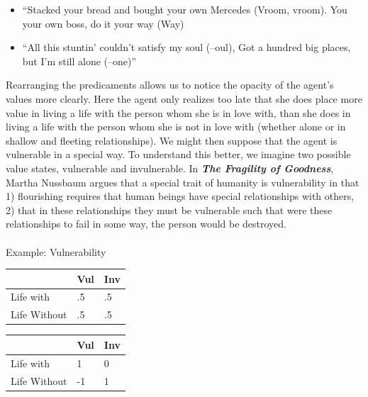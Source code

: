 \documentclass[
  letterpaper,
  DIV=11,
  numbers=noendperiod]{scrartcl}
\makeatletter
\let\oldparagraph\paragraph
\renewcommand{\paragraph}{
    \@ifstar
      \xxxParagraphStar
      \xxxParagraphNoStar
  }
\newcommand{\xxxParagraphStar}[1]{\oldparagraph*{#1}\mbox{}}
\newcommand{\xxxParagraphNoStar}[1]{\oldparagraph{#1}\mbox{}}
\newcounter{none} %
\providecommand{\tightlist}{%
  \setlength{\itemsep}{0pt}\setlength{\parskip}{0pt}}
\makeatother
\begin{document}
\begin{itemize}
\tightlist
\item
  ``Stacked your bread and bought your own Mercedes (Vroom, vroom). You
  your own boss, do it your way (Way)
\item
  ``All this stuntin' couldn't satisfy my soul (--oul), Got a hundred
  big places, but I'm still alone (--one)''
\end{itemize}

Rearranging the predicaments allows us to notice the opacity of the
agent's values more clearly. Here the agent only realizes too late that
she does place more value in living a life with the person whom she is
in love with, than she does in living a life with the person whom she is
not in love with (whether alone or in shallow and fleeting
relationships). We might then suppose that the agent is vulnerable in a
special way. To understand this better, we imagine two possible value
states, vulnerable and invulnerable. In \emph{\textbf{The Fragility of
Goodness}}, Martha Nussbaum argues that a special trait of humanity is
vulnerability in that 1) flourishing requires that human beings have
special relationships with others, 2) that in these relationships they
must be vulnerable such that were these relationships to fail in some
way, the person would be destroyed.

\paragraph{Example: Vulnerability}\label{example-vulnerability}

{\def\LTcaptype{none} %
\begin{longtable}[]{@{}lll@{}}
\toprule\noalign{}
& Vul & Inv \\
\midrule\noalign{}
\endhead
\bottomrule\noalign{}
\endlastfoot
Life with & .5 & .5 \\
Life Without & .5 & .5 \\
\end{longtable}
}

{\def\LTcaptype{none} %
\begin{longtable}[]{@{}lll@{}}
\toprule\noalign{}
& Vul & Inv \\
\midrule\noalign{}
\endhead
\bottomrule\noalign{}
\endlastfoot
Life with & 1 & 0 \\
Life Without & -1 & 1 \\
\end{longtable}
}
\end{document}
